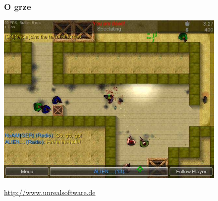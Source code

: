 \documentclass{beamer}
\begin{document}
\begin{frame}
\begin{figure}[ht]
\frametitle{O grze}
\includegraphics[scale=0.4]{cs2d.jpg}
\label{cs2d}
\caption{\href{http://www.unrealsoftware.de}{http://www.unrealsoftware.de}}
\end{figure}
\end{frame}
\end{document}
